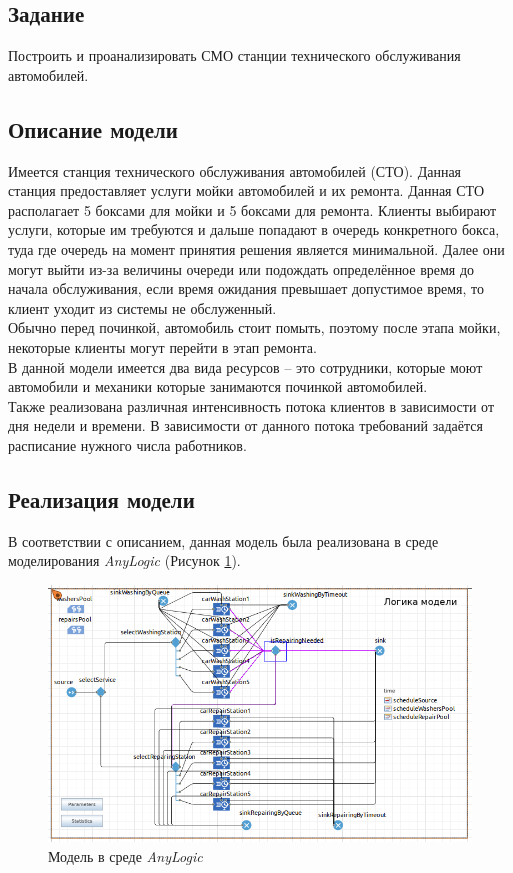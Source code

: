 \documentclass[14pt,fleqn]{extarticle}
\begin{document}
	\subsection*{Задание}
	Построить и проанализировать СМО станции технического обслуживания автомобилей.

	\subsection*{Описание модели}
	Имеется станция технического обслуживания автомобилей (СТО). Данная станция предоставляет услуги мойки автомобилей и их ремонта. Данная СТО располагает 5 боксами для мойки и 5 боксами для ремонта. Клиенты выбирают услуги, которые им требуются и дальше попадают в очередь конкретного бокса, туда где очередь на момент принятия решения является минимальной. Далее они могут выйти из-за величины очереди или подождать определённое время до начала обслуживания, если время ожидания превышает допустимое время, то клиент уходит из системы не обслуженный.\\
	
	Обычно перед починкой, автомобиль стоит помыть, поэтому после этапа мойки, некоторые клиенты могут перейти в этап ремонта.\\
	
	В данной модели имеется два вида ресурсов -- это сотрудники, которые моют автомобили и механики которые занимаются починкой автомобилей.\\
	
	Также реализована различная интенсивность потока клиентов в зависимости от дня недели и времени. В зависимости от данного потока требований задаётся расписание нужного числа работников.
	
	\newpage
	
	\subsection*{Реализация модели}
	
	В соответствии с описанием, данная модель была реализована в среде моделирования \textit{AnyLogic} (Рисунок \ref{fig:carwashing_anylogic_model}).
	
	\begin{figure}[h]
		\centering \includegraphics[scale=0.55]{carwashing_anylogic_model}
		\caption{Модель в среде \textit{AnyLogic}}
		\label{fig:carwashing_anylogic_model}
	\end{figure}
	
\end{document}

